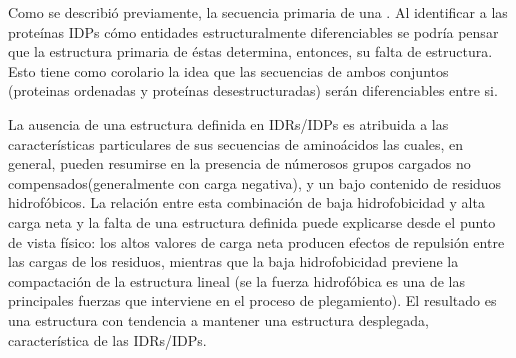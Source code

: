 Como se describió previamente, la secuencia primaria de una . Al identificar a las proteínas IDPs cómo entidades estructuralmente diferenciables se podría pensar que la estructura primaria de éstas determina, entonces, su falta de estructura.
Esto tiene como corolario la idea que las secuencias de ambos conjuntos (proteinas ordenadas y proteínas desestructuradas) serán diferenciables entre si.

La ausencia de una estructura definida en IDRs/IDPs es atribuida a las características particulares de sus secuencias de aminoácidos las cuales, en general, pueden resumirse en la presencia de númerosos grupos cargados no compensados(generalmente con carga negativa),
y un bajo contenido de residuos hidrofóbicos.
La relación entre esta combinación de baja hidrofobicidad y alta carga neta y la falta de una estructura definida puede explicarse desde el punto de vista físico:
los altos valores de carga neta producen efectos de repulsión entre las cargas de los residuos, mientras que la baja hidrofobicidad previene la compactación de la estructura lineal
(se la fuerza hidrofóbica es una de las principales fuerzas que interviene en el proceso de plegamiento).
El resultado es una estructura con tendencia a mantener una estructura desplegada, característica de las IDRs/IDPs.


